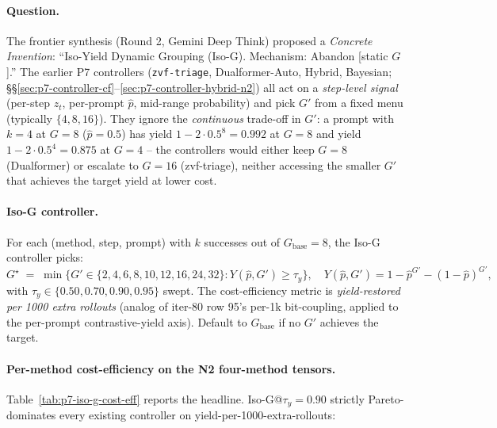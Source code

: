 \documentclass{article}
\begin{document}
\paragraph{Question.}
The frontier synthesis (Round 2, Gemini Deep Think) proposed a
\emph{Concrete Invention}: ``Iso-Yield Dynamic Grouping (Iso-G).
Mechanism: Abandon [static $G$].''  The earlier P7 controllers
(\texttt{zvf-triage}, Dualformer-Auto, Hybrid, Bayesian;
\S\S\ref{sec:p7-controller-cf}--\ref{sec:p7-controller-hybrid-n2})
all act on a \emph{step-level signal} (per-step $z_t$, per-prompt
$\hat p$, mid-range probability) and pick $G'$ from a fixed menu
(typically $\{4, 8, 16\}$).  They ignore the \emph{continuous}
trade-off in $G'$: a prompt with $k{=}4$ at $G{=}8$ ($\hat p = 0.5$)
has yield $1 - 2 \cdot 0.5^8 = 0.992$ at $G{=}8$ and yield
$1 - 2 \cdot 0.5^4 = 0.875$ at $G{=}4$ -- the controllers would either
keep $G{=}8$ (Dualformer) or escalate to $G{=}16$ (zvf-triage),
neither accessing the smaller $G'$ that achieves the
target yield at lower cost.

\paragraph{Iso-G controller.}
For each (method, step, prompt) with $k$ successes out of
$G_{\text{base}}{=}8$, the Iso-G controller picks:
\begin{equation}
G^\star \;=\; \min\bigl\{G' \in \{2,4,6,8,10,12,16,24,32\} :
                  Y(\hat p, G') \ge \tau_y\bigr\},
\quad Y(\hat p, G') = 1 - \hat p^{G'} - (1-\hat p)^{G'},
\label{eq:p7-iso-g}
\end{equation}
with $\tau_y \in \{0.50, 0.70, 0.90, 0.95\}$ swept.  The cost-efficiency
metric is \emph{yield-restored per 1000 extra rollouts} (analog of
iter-80 row 95's per-1k bit-coupling, applied to the per-prompt
contrastive-yield axis).  Default to $G_{\text{base}}$ if no $G'$
achieves the target.

\paragraph{Per-method cost-efficiency on the N2 four-method tensors.}
Table~\ref{tab:p7-iso-g-cost-eff} reports the headline.  Iso-G@$\tau_y{=}0.90$
strictly Pareto-dominates every existing controller on
yield-per-1000-extra-rollouts:
\end{document}

